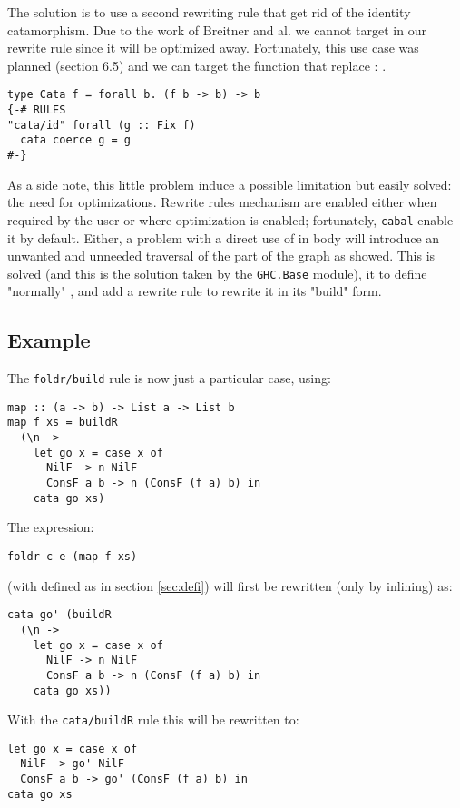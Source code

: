 The solution is to use a second rewriting rule that get rid of the identity catamorphism. Due to the work of Breitner and al. \cite{Breitner:2014:SZC:2692915.2628141} we cannot target  in our rewrite rule since it will be optimized away. Fortunately, this use case was planned (section 6.5) and we can target the function that replace : .

\begin{verbatim}
type Cata f = forall b. (f b -> b) -> b
{-# RULES
"cata/id" forall (g :: Fix f)
  cata coerce g = g
#-}
\end{verbatim}

As a side note, this little problem induce a possible limitation but easily solved: the need for optimizations. Rewrite rules mechanism are enabled either when required by the user or where optimization is enabled; fortunately, \verb|cabal| enable it by default. Either, a problem with a direct use of  in  body will introduce an unwanted and unneeded traversal of the part of the graph as showed. This is solved (and this is the solution taken by the \verb|GHC.Base| module), it to define "normally" , and add a rewrite rule to rewrite it in its "build" form.

\subsection{Example}
The \verb|foldr/build| rule is now just a particular case, using:
\begin{verbatim}
map :: (a -> b) -> List a -> List b
map f xs = buildR 
  (\n ->
    let go x = case x of
      NilF -> n NilF
      ConsF a b -> n (ConsF (f a) b) in
    cata go xs)
\end{verbatim}

The expression:
\begin{verbatim}
foldr c e (map f xs)
\end{verbatim}
(with  defined as in section \ref{sec:defi}) will first be rewritten (only by inlining) as:
\begin{verbatim}
cata go' (buildR 
  (\n ->
    let go x = case x of
      NilF -> n NilF
      ConsF a b -> n (ConsF (f a) b) in
    cata go xs))
\end{verbatim}

With the \verb|cata/buildR| rule this will be rewritten to:
\begin{verbatim}
let go x = case x of
  NilF -> go' NilF
  ConsF a b -> go' (ConsF (f a) b) in
cata go xs
\end{verbatim}

